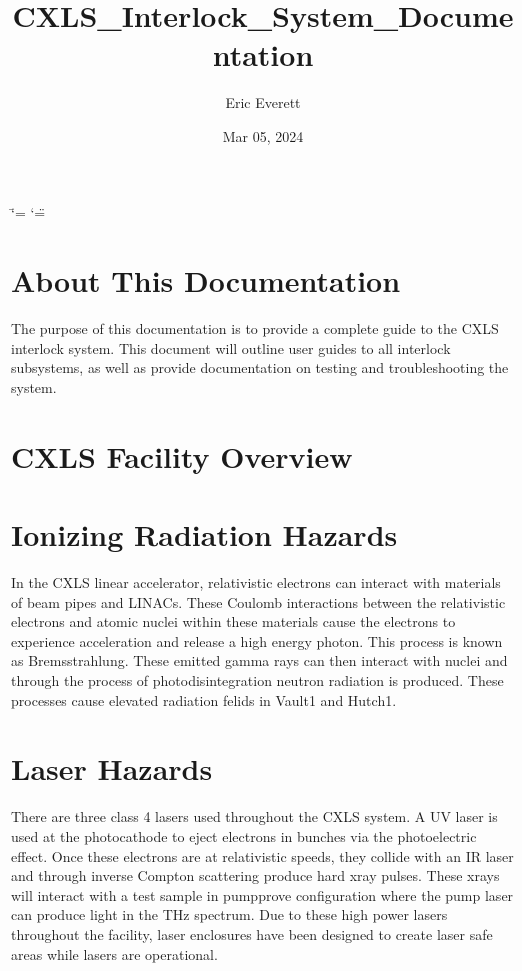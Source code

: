 \documentclass[letterpaper,10pt,english]{sphinxmanual}
\title{CXLS_Interlock_System_Documentation}
\date{Mar 05, 2024}
\author{Eric Everett}
\begin{document}
\ifdefined\shorthandoff
  \ifnum\catcode`\=\string=\active\shorthandoff{=}\fi
  \ifnum\catcode`\"=\active{}\fi
\fi

\pagestyle{empty}
\sphinxmaketitle
\pagestyle{plain}
\sphinxtableofcontents
\pagestyle{normal}
\label{\detokenize{index::doc}}



\chapter{About This Documentation}
\label{\detokenize{index:about-this-documentation}}
\sphinxAtStartPar
The purpose of this documentation is to provide a complete guide to the CXLS interlock system.
This document will outline user guides to all interlock subsystems, as well as provide documentation on testing and troubleshooting the system.


\chapter{CXLS Facility Overview}
\label{\detokenize{index:cxls-facility-overview}}

\sphinxAtStartPar



\chapter{Ionizing Radiation Hazards}
\label{\detokenize{index:ionizing-radiation-hazards}}
\sphinxAtStartPar
In the CXLS linear accelerator, relativistic electrons can interact with materials of beam pipes and LINACs.
These Coulomb interactions between the relativistic electrons and atomic nuclei within these materials cause the electrons to experience acceleration and release a high energy photon.
This process is known as Bremsstrahlung. These emitted gamma rays can then interact with nuclei and through the process of photodisintegration neutron radiation is produced.
These processes cause elevated radiation felids in Vault\sphinxhyphen{}1 and Hutch\sphinxhyphen{}1.


\chapter{Laser Hazards}
\label{\detokenize{index:laser-hazards}}
\sphinxAtStartPar
There are three class 4 lasers used throughout the CXLS system.
A UV laser is used at the photocathode to eject electrons in bunches via the photoelectric effect.
Once these electrons are at relativistic speeds, they collide with an IR laser and through inverse Compton scattering produce hard x\sphinxhyphen{}ray pulses.
These x\sphinxhyphen{}rays will interact with a test sample in pump\sphinxhyphen{}prove configuration where the pump laser can produce light in the THz spectrum.
Due to these high power lasers throughout the facility, laser enclosures have been designed to create laser safe areas while lasers are operational.
\end{document}
